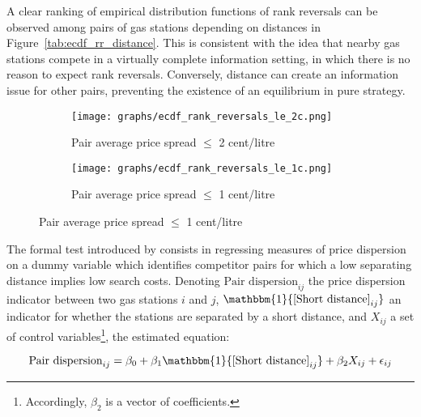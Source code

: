 \documentclass[english]{article}
\begin{document}
A clear ranking of empirical distribution functions of rank reversals can be observed among pairs of gas stations depending on distances in Figure~\ref{tab:ecdf_rr_distance}. This is consistent with the idea that nearby gas stations compete in a virtually complete information setting, in which there is no reason to expect rank reversals. Conversely, distance can create an information issue for other pairs, preventing the existence of an equilibrium in pure strategy.

\begin{figure}[H]
\centering
\caption{Empirical distribution functions of rank reversals}
\label{tab:ecdf_rr_distance}
\begin{subfigure}{.49\textwidth}
\centering
\texttt{[image: graphs/ecdf\_rank\_reversals\_le\_2c.png]}
\caption[short]{Pair average price spread $\le$ 2 cent/litre}
\end{subfigure}
\begin{subfigure}{.49\textwidth}
\centering
\texttt{[image: graphs/ecdf\_rank\_reversals\_le\_1c.png]}
\caption[short]{Pair average price spread $\le$ 1 cent/litre}
\end{subfigure}
\end{figure}

The formal test introduced by \cite{TAP11} consists in regressing measures of price dispersion on a dummy variable which identifies competitor pairs for which a low separating distance implies low search costs. Denoting $\text{Pair dispersion}_{ij}$ the price dispersion indicator between two gas stations $i$ and $j$, $\mathbbm{1}{\text{[Short distance]}_{ij}}$ an indicator for whether the stations are separated by a short distance, and $X_{ij}$ a set of control variables\footnote{Accordingly, $\beta_2$ is a vector of coefficients.}, the estimated equation:

\begin{equation}
\text{Pair dispersion}_{ij}= \beta_0 + \beta_1 \mathbbm{1}{\text{[Short distance]}_{ij}} + \beta_2 X_{ij} + \epsilon_{ij}
\end{equation}
\end{document}
